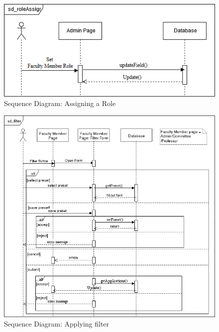 \documentclass[fontsize=12pt,paper=letter,twoside]{scrartcl}
\begin{document}
\begin{figure}[!htb]
\begin{center}
\includegraphics[width=.99\textwidth]{images/sd_roleAssign.png}
\end{center}
\caption{Sequence Diagram: Assigning a Role}
\label{fig:sd_assign_role}
\end{figure}

\begin{figure}[!htb]
\begin{center}
\includegraphics[width=.99\textwidth]{images/sd_filter.png}
\end{center}
\caption{Sequence Diagram: Applying filter}
\label{fig:sd_apply_filter}
\end{figure}
\end{document}
